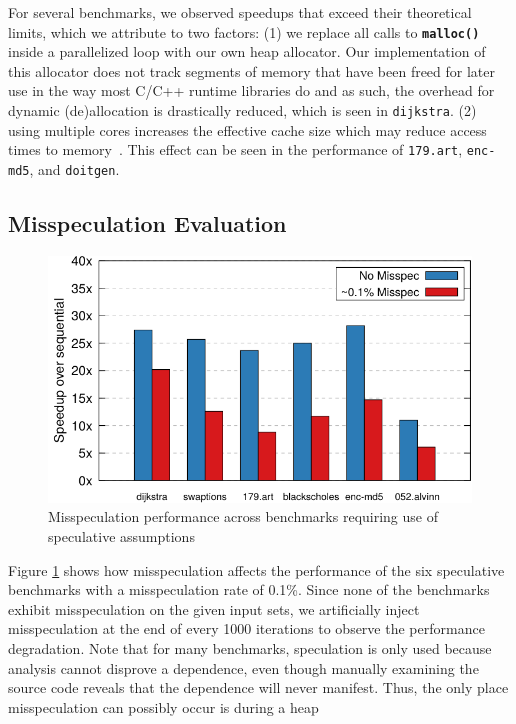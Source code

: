 For several benchmarks, we observed speedups that exceed their theoretical
limits, which we attribute to two factors:
(1) we replace all calls to \texttt{\textbf{malloc()}} inside a parallelized
loop with our own heap allocator. Our implementation of this allocator
does not track segments of memory that have been freed for later use in the
way most C/C++ runtime libraries do and as such, the overhead for dynamic
(de)allocation is drastically reduced, which is seen in \texttt{dijkstra}.
(2) using multiple cores increases the effective cache size which may
reduce access times to memory~\cite{jeon:11:oopsla}. This effect can be
seen in the performance of \texttt{179.art}, \texttt{enc-md5}, and
\texttt{doitgen}.

\subsection{Misspeculation Evaluation}
\begin{figure}[htp]
  \includegraphics[width=\columnwidth]{figures/misspec-crop}
  \caption{Misspeculation performance across benchmarks requiring use of
  speculative assumptions}
  \label{fig:misspec}
\end{figure}
Figure \ref{fig:misspec} shows how misspeculation affects the
performance of the six speculative benchmarks with a misspeculation rate of
0.1\%. Since none of the benchmarks exhibit misspeculation on the
given input sets, we artificially inject misspeculation at the end of
every 1000 iterations to observe the performance degradation.
Note that for many benchmarks, speculation is only used
because analysis cannot disprove a dependence, even though manually
examining the source code reveals that the dependence will never manifest.
Thus, the only place misspeculation can possibly occur is during a heap
